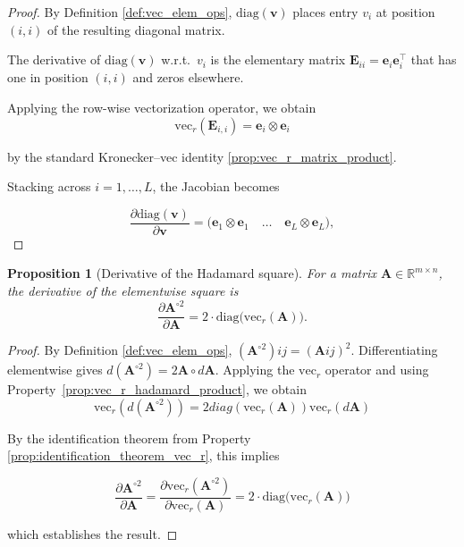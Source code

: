 \documentclass{article}
\newtheorem{proposition}{Proposition}
\begin{document}
\begin{proof}
By Definition \ref{def:vec_elem_ops}, $\mathrm{diag}(\mathbf{v})$ places entry $v_i$ at position $(i,i)$ of the resulting diagonal matrix.

The derivative of $\mathrm{diag}(\mathbf{v})$ w.r.t.\ $v_i$ is the elementary matrix $\mathbf{E}_{ii} = \mathbf{e}_i \mathbf{e}_i^\top$ that has one in position $(i,i)$ and zeros elsewhere.

Applying the row-wise vectorization operator, we obtain
\[
\mathrm{vec}_r(\mathbf{E}_{i,i}) = \mathbf{e}_i \otimes \mathbf{e}_i
\]

by the standard Kronecker–vec identity \ref{prop:vec_r_matrix_product}.

Stacking across $i=1,\dots,L$, the Jacobian becomes

\[
    \frac{\partial \mathrm{diag}(\mathbf{v})}{\partial \mathbf{v}}
    = \big(\mathbf{e}_1 \otimes \mathbf{e}_1 \quad \dots \quad \mathbf{e}_L \otimes \mathbf{e}_L\big),
\]
\end{proof}


\begin{proposition}[Derivative of the Hadamard square] \label{prop:hadamard_square_derivative}
For a matrix $\mathbf{A} \in \mathbb{R}^{m \times n}$, the derivative of the elementwise square is
\[
    \frac{\partial \mathbf{A}^{\circ 2}}{\partial \mathbf{A}}
    = 2 \cdot \mathrm{diag}\!\big(\mathrm{vec}_r(\mathbf{A})\big).
\]
\end{proposition}

\begin{proof}
By Definition \ref{def:vec_elem_ops}, $(\mathbf{A}^{\circ 2}){ij} = (\mathbf{A}{ij})^2$.
Differentiating elementwise gives $d(\mathbf{A}^{\circ 2}) = 2\mathbf{A} \circ d\mathbf{A}$.
Applying the $\mathrm{vec}_r$ operator and using Property~\ref{prop:vec_r_hadamard_product}, we obtain
\[
    \mathrm{vec}_r(d(\mathbf{A}^{\circ 2})) = 2 \textit{diag}(\mathrm{vec}_r(\mathbf{A})) \mathrm{vec}_r (d\mathbf{A})
\]

By the identification theorem from Property \ref{prop:identification_theorem_vec_r}, this implies

\[
    \frac{\partial \mathbf{A}^{\circ 2}}{\partial \mathbf{A}}
    = \frac{\partial \mathrm{vec}_r(\mathbf{A}^{\circ 2})}{\partial \mathrm{vec}_r(\mathbf{A})} = 2 \cdot \mathrm{diag}\!\big(\mathrm{vec}_r(\mathbf{A})\big)
\]

which establishes the result.
\end{proof}
\end{document}
